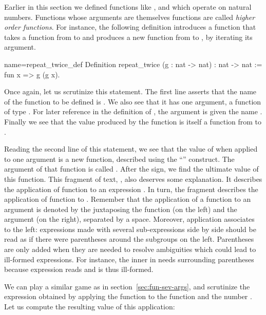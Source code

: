 Earlier in this section we defined functions like ,  and 
which operate on natural numbers. Functions whose arguments are
themselves functions are called \emph{higher order functions}.
For instance, the following definition introduces a function that
takes a function from  to  and produces a new function
from  to , by iterating its argument.

\begin{coq}{name=repeat_twice_def}{}
Definition repeat_twice (g : nat -> nat) : nat -> nat :=
  fun x => g (g x).
\end{coq}
Once again, let us scrutinize this \Coq{} statement. The first line
asserts that the name of the function to be defined is .
We also see that it has one argument, a function of
type .  For later reference in the definition of
, the argument is given the name .  Finally
we see that the value produced by the function 
is itself a function from  to .

Reading the second line of this statement, we see that the value
of  when applied to one argument is a new
function, described using the ``'' construct.  The
argument of that function is called .  After the \C{=>} sign, we
find the ultimate value of this function.  This fragment of text, , also deserves some explanation. It describes the
application of function  to an expression .  In turn,
the fragment  describes the application of function  to
. Remember that the  application of a function to an
argument is denoted by the juxtaposing the function (on the left) and
the argument (on the right), separated by a space. Moreover,
application associates to the left: expressions made with
several sub-expressions side by side should be read as if there were
parentheses around the subgroups on the left. Parentheses are
only added when they are needed to resolve ambiguities which could
lead to ill-formed expressions.  For instance, the inner  in
 needs surrounding parentheses because expression
 reads  and is thus ill-formed.

We can play a similar game as in section~\ref{sec:fun-sev-args},
and scrutinize the expression obtained by applying the
function  to  the function
 and the number . Let us compute the resulting value of this
application:

